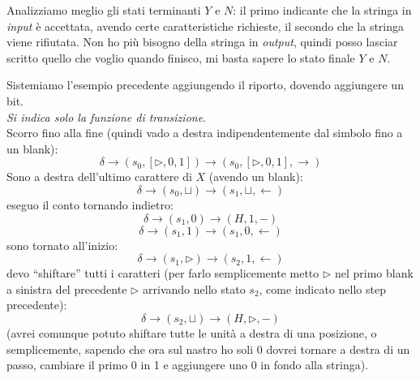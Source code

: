 Analizziamo meglio gli stati terminanti $Y$ e $N$: il primo indicante che la
stringa in \textit{input} è accettata, avendo certe caratteristiche richieste, il secondo
che la stringa viene rifiutata. Non ho più bisogno della stringa in
\textit{output}, quindi posso lasciar scritto quello che voglio quando finisco, mi basta
sapere lo stato finale $Y$ e $N$.
\begin{esempio}
  Sistemiamo l'esempio precedente aggiungendo il riporto, dovendo aggiungere un
  bit. \\
 \textit{Si indica solo la funzione di transizione}.\\
  Scorro fino alla fine (quindi vado a destra indipendentemente dal simbolo fino
  a un blank):
  \[\delta\to(s_0,[\triangleright, 0,1])\to(s_0,[\triangleright, 0,1],
    \rightarrow)\]
  Sono a destra dell'ultimo carattere di $X$ (avendo un blank):
  \[\delta\to(s_0,\sqcup)\to(s_1,\sqcup,\leftarrow)\]
  eseguo il conto tornando indietro:
  \[\delta\to(s_1,0)\to(H,1,-)\]
  \[\delta\to(s_1,1)\to(s_1,0,\leftarrow)\]
  sono tornato all'inizio:
  \[\delta\to(s_1,\triangleright)\to(s_2,1,\leftarrow)\]
  devo ``shiftare'' tutti i caratteri (per farlo semplicemente metto
  $\triangleright$ nel primo blank a sinistra del precedente $\triangleright$
  arrivando nello stato $s_2$, come indicato nello step precedente):
  \[\delta\to(s_2,\sqcup)\to(H,\triangleright,-)\]
  (avrei comunque potuto shiftare tutte le unità a destra di una posizione, o
  semplicemente, sapendo che ora sul nastro ho soli 0 dovrei tornare a destra di
  un passo, cambiare il primo 0 in 1 e aggiungere uno 0 in fondo alla
  stringa).
\end{esempio}
